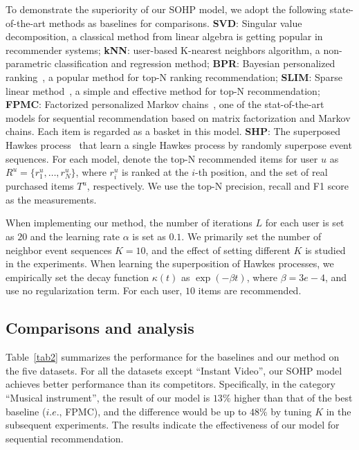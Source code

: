 \documentclass[runningheads]{llncs}
\begin{document}
To demonstrate the superiority of our SOHP model, we adopt the following state-of-the-art methods as baselines for comparisons. 
\textbf{SVD}: Singular value decomposition, a classical method from linear algebra is getting popular in recommender systems; 
\textbf{kNN}: user-based K-nearest neighbors algorithm, a non-parametric classification and regression method; 
\textbf{BPR}: Bayesian personalized ranking~\cite{rendle2012bpr}, a popular method for top-N ranking recommendation; 
\textbf{SLIM}: Sparse linear method~\cite{ning2011slim}, a simple and effective method for top-N recommendation; 
\textbf{FPMC}: Factorized personalized Markov chains~\cite{rendle2010factorizing}, one of the stat-of-the-art models for sequential recommendation based on matrix factorization and Markov chains. Each item is regarded as a basket in this model.
\textbf{SHP}: The superposed Hawkes process~\cite{xu2018benefits} that learn a single Hawkes process by randomly superpose event sequences. 
For each model, denote the top-N recommended items for user $u$ as $R^u = \{r_1^u,\ldots,r_N^u \}$, where $r_i^u$ is ranked at the $i$-th position, and the set of real purchased items $T^u$, respectively.
We use the top-N precision, recall and F1 score as the measurements.

When implementing our method, the number of iterations $L$ for each user is set as $20$ and the learning rate $\alpha$ is set as $0.1$. 
We primarily set the number of neighbor event sequences $K=10$, and the effect of setting different $K$ is studied in the experiments.
When learning the superposition of Hawkes processes, we empirically set the decay function $\kappa(t)$ as $\exp(-\beta t)$, where $\beta=3e-4$, and use no regularization term.
For each user, $10$ items are recommended.



\subsection{Comparisons and analysis}
Table~\ref{tab2} summarizes the performance for the baselines and our method on the five datasets. 
For all the datasets except ``Instant Video'', our SOHP model achieves better performance than its competitors. 
Specifically, in the category ``Musical instrument'', the result of our model is $13\%$ higher than that of the best baseline ($i.e.$, FPMC), and the difference would be up to $48\%$ by tuning $K$ in the subsequent experiments. 
The results indicate the effectiveness of our model for sequential recommendation.
\end{document}
